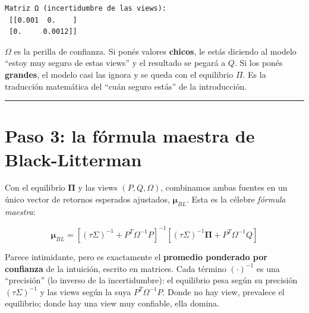 \documentclass[
  spanish,
  letterpaper,
  DIV=11,
  numbers=noendperiod]{scrreprt}
\begin{document}
\begin{verbatim}
Matriz Ω (incertidumbre de las views):
 [[0.001  0.    ]
 [0.     0.0012]]
\end{verbatim}

\begin{tcolorbox}[enhanced jigsaw, bottomrule=.15mm, colback=white, opacitybacktitle=0.6, arc=.35mm, toprule=.15mm, opacityback=0, breakable, titlerule=0mm, left=2mm, coltitle=black, colbacktitle=quarto-callout-tip-color!10!white, colframe=quarto-callout-tip-color-frame, leftrule=.75mm, toptitle=1mm, bottomtitle=1mm, title=\textcolor{quarto-callout-tip-color}{\faLightbulb}\hspace{0.5em}{El sentido de Ω}, rightrule=.15mm]

\(\Omega\) es la perilla de confianza. Si ponés valores \textbf{chicos},
le estás diciendo al modelo ``estoy muy seguro de estas views'' y el
resultado se pegará a \(Q\). Si los ponés \textbf{grandes}, el modelo
casi las ignora y se queda con el equilibrio \(\Pi\). Es la traducción
matemática del ``cuán seguro estás'' de la introducción.

\end{tcolorbox}

\begin{center}\rule{0.5\linewidth}{0.5pt}\end{center}

\chapter{Paso 3: la fórmula maestra de
Black-Litterman}\label{paso-3-la-fuxf3rmula-maestra-de-black-litterman}

Con el equilibrio \(\boldsymbol{\Pi}\) y las views \((P, Q, \Omega)\),
combinamos ambas fuentes en un único vector de retornos esperados
ajustados, \(\boldsymbol{\mu}_{BL}\). Esta es la célebre \emph{fórmula
maestra}:

\[\boldsymbol{\mu}_{BL} = \left[ (\tau\Sigma)^{-1} + P^T \Omega^{-1} P \right]^{-1} \left[ (\tau\Sigma)^{-1} \boldsymbol{\Pi} + P^T \Omega^{-1} Q \right]\]

Parece intimidante, pero es exactamente el \textbf{promedio ponderado
por confianza} de la intuición, escrito en matrices. Cada término
\((\cdot)^{-1}\) es una ``precisión'' (lo inverso de la incertidumbre):
el equilibrio pesa según su precisión \((\tau\Sigma)^{-1}\) y las views
según la suya \(P^T\Omega^{-1}P\). Donde no hay view, prevalece el
equilibrio; donde hay una view muy confiable, ella domina.
\end{document}
